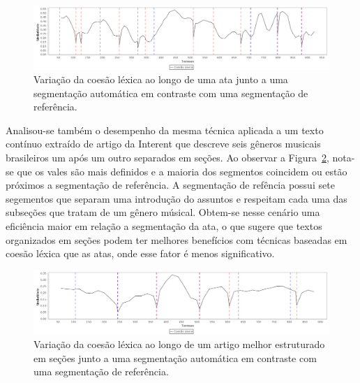   \begin{figure}[!h]
	  \centering
	  \includegraphics[width=\textwidth]{conteudo/capitulos/figs/coesaolexicaTT-50-9.png}
	  \caption{Variação da coesão léxica ao longo de uma ata junto a uma segmentação automática em contraste com uma segmentação de referência.}
	  \label{fig:coesaolexicaTT}
  \end{figure}


Analisou-se também o desempenho da mesma técnica aplicada a um texto contínuo extraído de artigo da Interent que descreve seis gêneros musicais brasileiros um após um outro separados em seções. Ao observar a Figura~\ref{fig:coesaolexicaTT-generos-musicais}, nota-se que os vales são mais definidos e a maioria dos segmentos coincidem ou estão próximos a segmentação de referência. A segmentação de refência possui sete segementos que separam uma introdução do assuntos e respeitam cada uma das subseções que tratam de um gênero músical.  Obtem-se nesse cenário uma eficiência maior em relação a segmentação da ata, o que sugere que textos organizados em seções podem ter melhores benefícios com técnicas baseadas em coesão léxica que as atas, onde esse fator é menos significativo.  %



  \begin{figure}[!h]
	  \centering
	  \includegraphics[width=\textwidth]{conteudo/capitulos/figs/generos-musicais-TT-40-20.png}
	  \caption{Variação da coesão léxica ao longo de um artigo melhor estruturado em seções junto a uma segmentação automática em contraste com uma segmentação de referência.}
	  \label{fig:coesaolexicaTT-generos-musicais}
  \end{figure}





